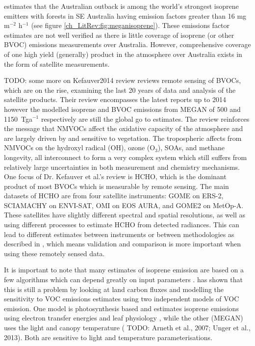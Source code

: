     \citet{Guenther2006} estimates that the Australian outback is among the world's strongest isoprene emitters with forests in SE Australia having emission factors greater than 16 mg m$^{-2}$ h$^{-1}$ (see figure \ref{ch_LitRev:fig:meganisoprene}).
    These emissions factor estimates are not well verified as there is little coverage of isoprene (or other BVOC) emissions measurements over Australia.
    However, comprehensive coverage of one high yield (generally) product in the atmosphere over Australia exists in the form of satellite measurements.
  
    TODO: some more on Kefauver2014 review 
    \cite{Kefauver2014} reviews remote sensing of BVOCs, which are on the rise, examining the last 20 years of data and analysis of the satellite products.
    Their review encompasses the latest reports up to 2014 however the modelled isoprene and BVOC emissions from MEGAN \citep{Guenther2000} of 500 and 1150~Tga$^{-1}$ respectively are still the global go to estimates.
    The review reinforces the message that NMVOCs affect the oxidative capacity of the atmosphere and are largely driven by and sensitive to vegetation.
    The tropospheric affects from NMVOCs on the hydroxyl radical (OH), ozone (O$_3$), SOAs, and methane longevity, all interconnect to form a very complex system which still suffers from relatively large uncertainties in both measurement and chemistry mechanisms.
    One focus of Dr. Kefauver et al.'s review is HCHO, which is the dominant product of most BVOCs which is measurable by remote sensing.
    The main datasets of HCHO are from four satellite instruments: GOME on ERS-2, SCIAMACHY on ENVI-SAT, OMI on EOS AURA, and GOME2 on MetOp-A.
    These satellites have slightly different spectral and spatial resolutions, as well as using different processes to estimate HCHO from  detected radiances.
    This can lead to different estimates between instruments or between methodologies as described in \cite{Lorent2017}, which means validation and comparison is more important when using these remotely sensed data.
    
    It is important to note that many estimates of isoprene emission are based on a few algorithms which can depend greatly on input parameters \citep{Niinemets2010}.
    \citet{Yue2015} has shown that this is still a problem by looking at land carbon fluxes and modelling the sensitivity to VOC emissions estimates using two independent models of VOC emission.
    One model is photosynthesis based and estimates isoprene emissions using electron transfer energies and leaf physiology \citep{Niinemets1999}, while the other (MEGAN) uses the light and canopy temperature (\citep{Guenther1995} TODO: Arneth et al., 2007; Unger et al., 2013).
    Both are sensitive to light and temperature parameterisations.
    

